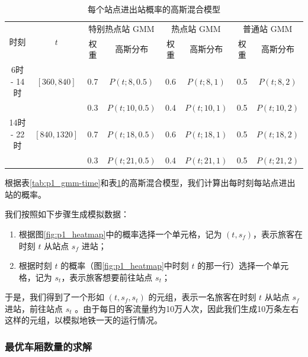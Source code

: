 \documentclass[12pt,a4paper]{mcmthesis}
\begin{document}
    \begin{table}[h]
        \centering
        \caption{每个站点进出站概率的高斯混合模型}
        \label{tab:p1_gmm-station}
        \begin{tabular}{c|c|cc|cc|cc}
            \hline
            \multirow{2}{*}{时刻} & \multirow{2}{*}{$t$} & \multicolumn{2}{c|}{特别热点站 GMM} & \multicolumn{2}{c}{热点站 GMM}
            & \multicolumn{2}{c}{普通站 GMM}
            \\ \cline{3-6}
            &                         & 权重  & 高斯分布          & 权重  & 高斯分布        & 权重  & 高斯分布        \\ \hline
            6时 - 14时  & $\left[360,840\right]$  & 0.7 & $P(t;8,0.5)$  & 0.6 & $P(t;8,1)$  & 0.5 & $P(t;8,2)$  \\
            &                         & 0.3 & $P(t;10,0.5)$ & 0.4 & $P(t;10,1)$ & 0.5 & $P(t;10,2)$ \\
            14时 - 22时 & $\left[840,1320\right]$ & 0.7 & $P(t;18,0.5)$ & 0.6 & $P(t;18,1)$ & 0.5 & $P(t;18,2)$ \\
            &                         & 0.3 & $P(t;21,0.5)$ & 0.4 & $P(t;21,1)$ & 0.5 & $P(t;21,2)$ \\ \hline
        \end{tabular}
    \end{table}

    根据表\ref{tab:p1_gmm-time}和表\ref{tab:p1_gmm-station}的高斯混合模型，我们计算出每时刻每站点进出站的概率。

    我们按照如下步骤生成模拟数据：

    \begin{enumerate}
        \item 根据图\ref{fig:p1_heatmap}中的概率选择一个单元格，记为 $(t,s_f)$，表示旅客在时刻 $t$ 从站点 $s_f$ 进站；
        \item 根据时刻 $t$ 的概率（图\ref{fig:p1_heatmap}中时刻 $t$ 的那一行）选择一个单元格，记为 $s_t$，表示旅客想要前往站点 $s_t$；
    \end{enumerate}

    于是，我们得到了一个形如 $(t,s_f,s_t)$ 的元组，表示一名旅客在时刻 $t$ 从站点 $s_f$ 进站，前往站点 $s_t$ 。由于每日的客流量约为10万人次，因此我们生成10万条左右这样的元组，以模拟地铁一天的运行情况。

    \subsubsection{最优车厢数量的求解}
\end{document}
